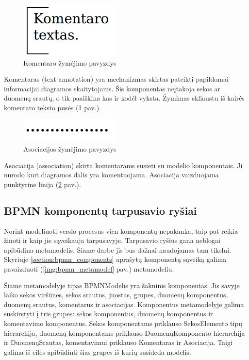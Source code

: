 \begin{figure}[H]
	\centering
	\includegraphics[width=5cm]{img/bpm-components/text_annotation}
	\caption{Komentaro žymėjimo pavyzdys}
	\label{img:bpm_components_text_annotation}
\end{figure}

Komentaras (text annotation) yra mechanizmas skirtas pateikti papildomai informacijai diagramos skaitytojams. Šis komponentas neįtakoja sekos ar duomenų srautų, o tik paaiškina kas ir kodėl vyksta. Žymimas skliaustu iš kairės komentaro teksto pusės (\ref{img:bpm_components_text_annotation} pav.).

\begin{figure}[H]
	\centering
	\includegraphics[width=5cm]{img/bpm-components/association}
	\caption{Asociacijos žymėjimo pavyzdys}
	\label{img:bpm_components_text_association}
\end{figure}

Asociacija (association) skirta komentarams susieti su modelio komponentais. Ji nurodo kuri diagramos dalis yra komentuojama. Asociacija vaizduojama punktyrine linija (\ref{img:bpm_components_text_association} pav.).

\subsection{BPMN komponentų tarpusavio ryšiai}
Norint modeliuoti verslo procesus vien komponentų nepakanka, taip pat reikia žinoti ir kaip jie sąveikauja tarpusavyje. Tarpusavio ryšius gana neblogai apibūdina metamodelis. Šiame darbe jis bus dažnai naudojamas tam tikslui. Skyriuje \ref{section:bpmn_components} aprašytų komponentų sąveiką galima pavaizduoti (\ref{img:bpmn_metamodel} pav.) metamodeliu.

Šiame metamodelyje tipas BPMNModelis yra šakninis komponentas. Jis savyje laiko sekos viršūnes, sekos srautus, juostas, grupes, duomenų komponentus, duomenų srautus, komentarus ir asociacijas.
Komponentus metamodelyje galima suskirstyti į tris grupes: sekos komponentus, duomenų komponentus ir komentavimo komponentus. Sekos komponentams priklauso SekosElemento tipų hierarchija, duomenų komponentams priklauso DuomenųKomponento hierarchija ir DuomenųSrautas, komentavimui priklauso Komentaras ir Asociacija. Taigi galima iš eilės apibūdinti šias grupes iš kurių susideda \BPMN modelis.

